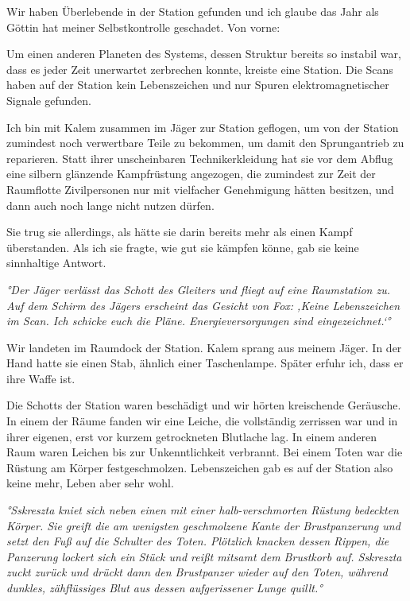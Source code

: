 \documentclass[11pt]{scrartcl}
\begin{document}
Wir haben Überlebende in der Station gefunden und ich glaube das Jahr
als Göttin hat meiner Selbstkontrolle geschadet. Von vorne:

Um einen anderen Planeten des Systems, dessen Struktur bereits so
instabil war, dass es jeder Zeit unerwartet zerbrechen konnte, kreiste
eine Station. Die Scans haben auf der Station kein Lebenszeichen und nur
Spuren elektromagnetischer Signale gefunden.

Ich bin mit Kalem zusammen im Jäger zur Station geflogen, um von der
Station zumindest noch verwertbare Teile zu bekommen, um damit den
Sprungantrieb zu reparieren. Statt ihrer unscheinbaren Technikerkleidung
hat sie vor dem Abflug eine silbern glänzende Kampfrüstung angezogen,
die zumindest zur Zeit der Raumflotte Zivilpersonen nur mit vielfacher
Genehmigung hätten besitzen, und dann auch noch lange nicht nutzen
dürfen.

Sie trug sie allerdings, als hätte sie darin bereits mehr als einen
Kampf überstanden. Als ich sie fragte, wie gut sie kämpfen könne, gab
sie keine sinnhaltige Antwort.

\emph{°Der Jäger verlässt das Schott des Gleiters und fliegt auf eine
Raumstation zu. Auf dem Schirm des Jägers erscheint das Gesicht von Fox:
‚Keine Lebenszeichen im Scan. Ich schicke euch die Pläne.
Energieversorgungen sind eingezeichnet.`°}

Wir landeten im Raumdock der Station. Kalem sprang aus meinem Jäger. In
der Hand hatte sie einen Stab, ähnlich einer Taschenlampe. Später erfuhr
ich, dass er ihre Waffe ist.

Die Schotts der Station waren beschädigt und wir hörten kreischende
Geräusche. In einem der Räume fanden wir eine Leiche, die vollständig
zerrissen war und in ihrer eigenen, erst vor kurzem getrockneten
Blutlache lag. In einem anderen Raum waren Leichen bis zur
Unkenntlichkeit verbrannt. Bei einem Toten war die Rüstung am Körper
festgeschmolzen. Lebenszeichen gab es auf der Station also keine mehr,
Leben aber sehr wohl.

\emph{°Sskreszta kniet sich neben einen mit einer halb-verschmorten
Rüstung bedeckten Körper. Sie greift die am wenigsten geschmolzene Kante
der Brustpanzerung und setzt den Fuß auf die Schulter des Toten.
Plötzlich knacken dessen Rippen, die Panzerung lockert sich ein Stück
und reißt mitsamt dem Brustkorb auf. Sskreszta zuckt zurück und drückt
dann den Brustpanzer wieder auf den Toten, während dunkles, zähflüssiges
Blut aus dessen aufgerissener Lunge quillt.°}
\end{document}
